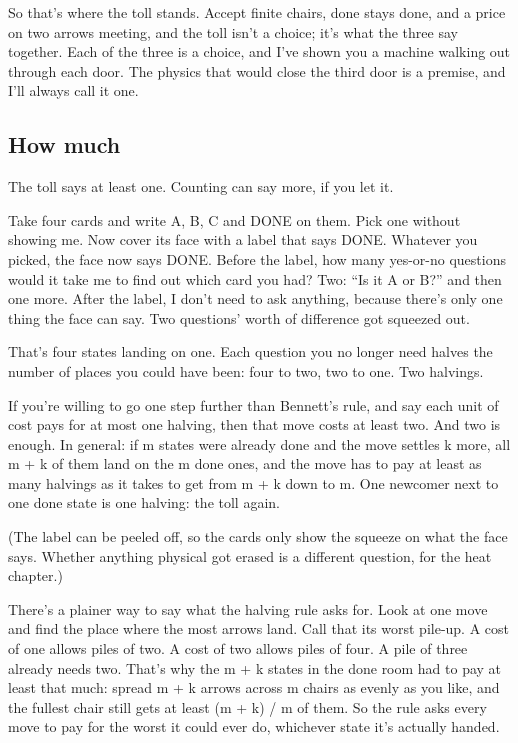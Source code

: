 \documentclass[11pt,twoside]{article}
\theoremstyle{thielethm}
\theoremstyle{thieledef}
\theoremstyle{thieledef}
\theoremstyle{thieledef}
\theoremstyle{thielethm}
\theoremstyle{thieleobs}
\theoremstyle{thielethm}
\begin{document}
So that's where the toll stands. Accept finite chairs, done stays done, and a price on two arrows meeting, and the toll isn't a choice; it's what the three say together. Each of the three is a choice, and I've shown you a machine walking out through each door. The physics that would close the third door is a premise, and I'll always call it one.

\subsection{How much}

The toll says at least one. Counting can say more, if you let it.

Take four cards and write A, B, C and DONE on them. Pick one without showing me. Now cover its face with a label that says DONE. Whatever you picked, the face now says DONE. Before the label, how many yes-or-no questions would it take me to find out which card you had? Two: ``Is it A or B?'' and then one more. After the label, I don't need to ask anything, because there's only one thing the face can say. Two questions' worth of difference got squeezed out.

That's four states landing on one. Each question you no longer need halves the number of places you could have been: four to two, two to one. Two halvings.

If you're willing to go one step further than Bennett's rule, and say each unit of cost pays for at most one halving, then that move costs at least two. And two is enough. In general: if m states were already done and the move settles k more, all m + k of them land on the m done ones, and the move has to pay at least as many halvings as it takes to get from m + k down to m. One newcomer next to one done state is one halving: the toll again.

(The label can be peeled off, so the cards only show the squeeze on what the face says. Whether anything physical got erased is a different question, for the heat chapter.)

There's a plainer way to say what the halving rule asks for. Look at one move and find the place where the most arrows land. Call that its worst pile-up. A cost of one allows piles of two. A cost of two allows piles of four. A pile of three already needs two. That's why the m + k states in the done room had to pay at least that much: spread m + k arrows across m chairs as evenly as you like, and the fullest chair still gets at least (m + k) / m of them. So the rule asks every move to pay for the worst it could ever do, whichever state it's actually handed.
\end{document}
